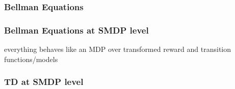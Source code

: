 \documentclass[]{article}
\theoremstyle{definition}
\begin{document}
\subsubsection{Bellman Equations}
\label{ssub:option_model_bellman_equations}

\subsubsection{Bellman Equations at SMDP level}
\label{ssub:bellman_equations_at_smdp_level}
everything behaves like an MDP over transformed reward and transition functions/models


\subsubsection{TD at SMDP level}
\label{ssub:td_at_smdp_level}
\end{document}
